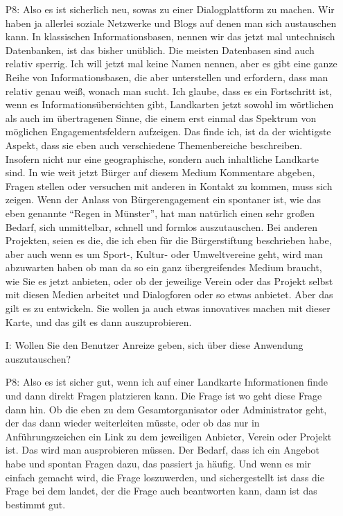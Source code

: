 \begin{itemize}
    \item[P8:] Also es ist sicherlich neu, sowas zu einer Dialogplattform zu machen. Wir haben ja allerlei soziale Netzwerke und Blogs auf denen man sich austauschen kann. In klassischen Informationsbasen, nennen wir das jetzt mal untechnisch Datenbanken, ist das bisher un{\"u}blich. Die meisten Datenbasen sind auch relativ sperrig. Ich will jetzt mal keine Namen nennen, aber es gibt eine ganze Reihe von Informationsbasen, die aber unterstellen und erfordern, dass man relativ genau wei{\ss}, wonach man sucht. Ich glaube, dass es ein Fortschritt ist, wenn es Informations{\"u}bersichten gibt, Landkarten jetzt sowohl im w{\"o}rtlichen als auch im {\"u}bertragenen Sinne, die einem erst einmal das Spektrum von m{\"o}glichen Engagementsfeldern aufzeigen. Das finde ich, ist da der wichtigste Aspekt, dass sie eben auch verschiedene Themenbereiche beschreiben. Insofern nicht nur eine geographische, sondern auch inhaltliche Landkarte sind. In wie weit jetzt B{\"u}rger auf diesem Medium Kommentare abgeben, Fragen stellen oder versuchen mit anderen in Kontakt zu kommen, muss sich zeigen. Wenn der Anlass von B{\"u}rgerengagement ein spontaner ist, wie das eben genannte "`Regen in M{\"u}nster"', hat man nat{\"u}rlich einen sehr gro{\ss}en Bedarf, sich unmittelbar, schnell und formlos auszutauschen. Bei anderen Projekten, seien es die, die ich eben f{\"u}r die B{\"u}rgerstiftung beschrieben habe, aber auch wenn es um Sport-, Kultur- oder Umweltvereine geht, wird man abzuwarten haben ob man da so ein ganz {\"u}bergreifendes Medium braucht, wie Sie es jetzt anbieten, oder ob der jeweilige Verein oder das Projekt selbst mit diesen Medien arbeitet und Dialogforen oder so etwas anbietet. Aber das gilt es zu entwickeln. Sie wollen ja auch etwas innovatives machen mit dieser Karte, und das gilt es dann auszuprobieren.
    \item[I:] Wollen Sie den Benutzer Anreize geben, sich {\"u}ber diese Anwendung auszutauschen?
    \item[P8:] Also es ist sicher gut, wenn ich auf einer Landkarte Informationen finde und dann direkt Fragen platzieren kann. Die Frage ist wo geht diese Frage dann hin. Ob die eben zu dem Gesamtorganisator oder Administrator geht, der das dann wieder weiterleiten m{\"u}sste, oder ob das nur in Anf{\"u}hrungszeichen ein Link zu dem jeweiligen Anbieter, Verein oder Projekt ist. Das wird man ausprobieren m{\"u}ssen. Der Bedarf, dass ich ein Angebot habe und spontan Fragen dazu, das passiert ja h{\"a}ufig. Und wenn es mir einfach gemacht wird, die Frage loszuwerden, und sichergestellt ist dass die Frage bei dem landet, der die Frage auch beantworten kann, dann ist das bestimmt gut.

\end{itemize}
